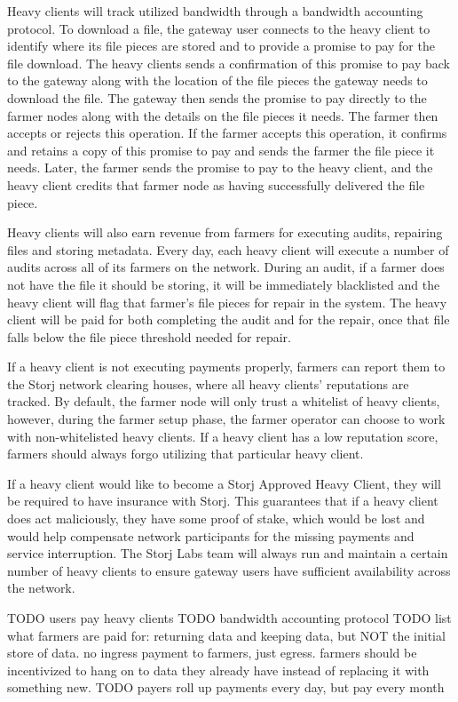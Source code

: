 \documentclass[a4paper,10pt]{article} \usepackage[utf8]{inputenc}
\newcommand{\todo}[1]{{\color{red} TODO #1 }}
\begin{document}
Heavy clients will track utilized bandwidth through a bandwidth accounting
protocol. To download a file, the gateway user connects to the heavy client to
identify where its file pieces are stored and to provide a promise to pay for
the file download. The heavy clients sends a confirmation of this promise to
pay back to the gateway along with the location of the file pieces the gateway
needs to download the file. The gateway then sends the promise to pay directly
to the farmer nodes along with the details on the file pieces it needs. The
farmer then accepts or rejects this operation. If the farmer accepts this
operation, it confirms and retains a copy of this promise to pay and sends the
farmer the file piece it needs. Later, the farmer sends the promise to pay to
the heavy client, and the heavy client credits that farmer node as having
successfully delivered the file piece.

Heavy clients will also earn revenue from farmers for executing audits,
repairing files and storing metadata. Every day, each heavy client will execute
a number of audits across all of its farmers on the network. During an audit,
if a farmer does not have the file it should be storing, it will be immediately
blacklisted and the heavy client will flag that farmer’s file pieces for repair
in the system. The heavy client will be paid for both completing the audit and
for the repair, once that file falls below the file piece threshold needed for
repair.

If a heavy client is not executing payments properly, farmers can report them
to the Storj network clearing houses, where all heavy clients’ reputations are
tracked. By default, the farmer node will only trust a whitelist of heavy
clients, however, during the farmer setup phase, the farmer operator can choose
to work with non-whitelisted heavy clients. If a heavy client has a low
reputation score, farmers should always forgo utilizing that particular heavy
client.

If a heavy  client  would  like  to  become  a  Storj  Approved Heavy Client,
they will be required to have insurance with Storj. This guarantees that if a
heavy client does act maliciously, they have some proof of stake, which would
be lost and would help compensate network participants for the missing payments
and service interruption. The Storj Labs team will always run and maintain a
certain number of heavy clients to ensure gateway users have sufficient
availability across the network.

\todo{users pay heavy clients}
\todo{bandwidth accounting protocol}
\todo{list what farmers are paid for: returning data and keeping data, but
NOT the initial store of data. no ingress payment to farmers, just egress.
farmers should be incentivized to hang on to data they already have instead of
replacing it with something new.}
\todo{payers roll up payments every day, but pay every month}
\end{document}
